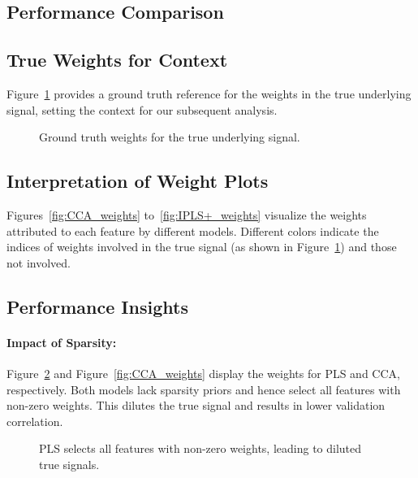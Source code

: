 \subsection{Performance Comparison}

\subsection{True Weights for Context}

Figure~\ref{fig:True_weights} provides a ground truth reference for the weights in the true underlying signal, setting the context for our subsequent analysis.

\begin{figure}[h]
    \centering
    
    \caption{Ground truth weights for the true underlying signal.}
    \label{fig:True_weights}
\end{figure}

\subsection{Interpretation of Weight Plots}

Figures~\ref{fig:CCA_weights} to~\ref{fig:IPLS+_weights} visualize the weights attributed to each feature by different models.
Different colors indicate the indices of weights involved in the true signal (as shown in Figure~\ref{fig:True_weights}) and those not involved.

\subsection{Performance Insights}

\paragraph{Impact of Sparsity:}
Figure~\ref{fig:PLS_weights} and Figure~\ref{fig:CCA_weights} display the weights for PLS and CCA, respectively.
Both models lack sparsity priors and hence select all features with non-zero weights.
This dilutes the true signal and results in lower validation correlation.

\begin{figure}[h]
    \centering
    
    \caption{PLS selects all features with non-zero weights, leading to diluted true signals.}
    \label{fig:PLS_weights}
\end{figure}

